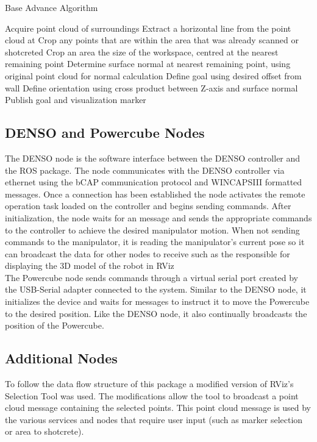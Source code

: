 \begin{algorithm}[H]
\caption{Base Advance Algorithm}
\label{alg:findandmove}
\begin{algorithmic}[1]
\State Acquire point cloud of surroundings
\State Extract a horizontal line from the point cloud at 
\State Crop any points that are within the area that was already scanned or shotcreted
\State Crop an area the size of the workspace, centred at the nearest remaining point
\State Determine surface normal at nearest remaining point, using original point cloud for normal calculation
\State Define  goal using desired offset from wall
\State Define  orientation using cross product between Z-axis and surface normal
\State Publish  goal and visualization marker
\end{algorithmic}
\end{algorithm}

\subsection{DENSO and Powercube Nodes}
The DENSO node is the software interface between the DENSO controller and the ROS package. The node communicates with the DENSO controller via ethernet using the bCAP communication protocol and WINCAPSIII formatted messages. Once a connection has been established the node activates the remote operation task loaded on the controller and begins sending commands. After initialization, the node waits for an  message and sends the appropriate commands to the controller to achieve the desired manipulator motion. When not sending commands to the manipulator, it is reading the manipulator's current pose so it can broadcast the data for other nodes to receive such as the  responsible for displaying the 3D model of the robot in RViz\\

The Powercube node sends commands through a virtual serial port created by the USB-Serial adapter connected to the system. Similar to the DENSO node, it initializes the device and waits for  messages to instruct it to move the Powercube to the desired position. Like the DENSO node, it also continually broadcasts the position of the Powercube.\\
 
\subsection{Additional Nodes}
To follow the data flow structure of this package a modified version of RViz's Selection Tool was used. The modifications allow the tool to broadcast a point cloud message containing the selected points. This point cloud message is used by the various services and nodes that require user input (such as marker selection or area to shotcrete).\\

